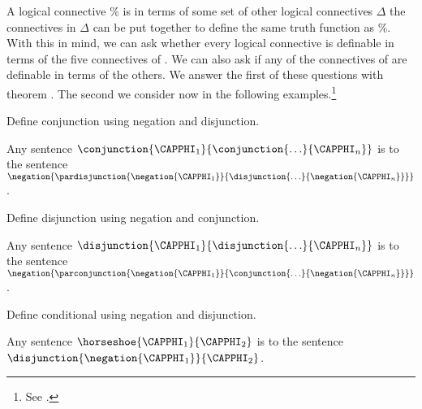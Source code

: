 A logical connective $\%$ is  in terms of some set of other logical connectives $\Delta$ \Iff the connectives in $\Delta$ can be put together to define the same truth function as $\%$. 
With this in mind, we can ask whether every logical connective is definable in terms of the five connectives of \GSL{}.
We can also ask if any of the connectives of \GSL{} are definable in terms of the others.
We answer the first of these questions with theorem .
The second we consider now in the following examples.\footnote{See \citetext{\citealt{Post1921}, \citealt[17]{Hodges2001}}.}

\begin{majorILnc}{}
	Define conjunction using negation and disjunction.
\end{majorILnc}
\begin{PROOF}
	Any sentence $\conjunction{\CAPPHI_1}{\conjunction{\ldots}{\CAPPHI_{\integer{n}}}}$ is  to the sentence $\negation{\pardisjunction{\negation{\CAPPHI_1}}{\disjunction{\ldots}{\negation{\CAPPHI_{\integer{n}}}}}}$.
\end{PROOF}

\begin{majorILnc}{}
	Define disjunction using negation and conjunction.
\end{majorILnc}
\begin{PROOF}
	Any sentence $\disjunction{\CAPPHI_1}{\disjunction{\ldots}{\CAPPHI_{\integer{n}}}}$ is  to the sentence $\negation{\parconjunction{\negation{\CAPPHI_1}}{\conjunction{\ldots}{\negation{\CAPPHI_{\integer{n}}}}}}$.
\end{PROOF}

\begin{majorILnc}{}
	Define conditional using negation and disjunction.
\end{majorILnc}
\begin{PROOF}
	Any sentence $\horseshoe{\CAPPHI_1}{\CAPPHI_2}$ is  to the sentence $\disjunction{\negation{\CAPPHI_1}}{\CAPPHI_2}$.
\end{PROOF}


